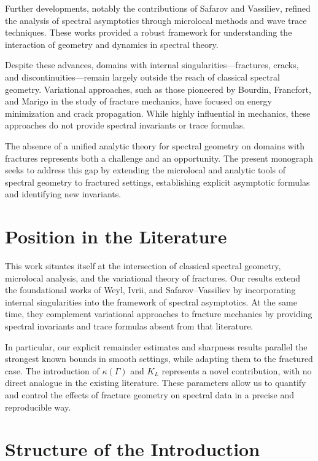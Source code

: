 Further developments, notably the contributions of Safarov and Vassiliev,
refined the analysis of spectral asymptotics through microlocal methods
and wave trace techniques. These works provided a robust framework for
understanding the interaction of geometry and dynamics in spectral
theory.

Despite these advances, domains with internal singularities—fractures,
cracks, and discontinuities—remain largely outside the reach of classical
spectral geometry. Variational approaches, such as those pioneered by
Bourdin, Francfort, and Marigo in the study of fracture mechanics, have
focused on energy minimization and crack propagation. While highly
influential in mechanics, these approaches do not provide spectral
invariants or trace formulas.

The absence of a unified analytic theory for spectral geometry on domains
with fractures represents both a challenge and an opportunity. The present
monograph seeks to address this gap by extending the microlocal and
analytic tools of spectral geometry to fractured settings, establishing
explicit asymptotic formulas and identifying new invariants.

\section{Position in the Literature}

This work situates itself at the intersection of classical spectral
geometry, microlocal analysis, and the variational theory of fractures.
Our results extend the foundational works of Weyl, Ivrii, and
Safarov–Vassiliev by incorporating internal singularities into the
framework of spectral asymptotics. At the same time, they complement
variational approaches to fracture mechanics by providing spectral
invariants and trace formulas absent from that literature.

In particular, our explicit remainder estimates and sharpness results
parallel the strongest known bounds in smooth settings, while adapting
them to the fractured case. The introduction of $\kappa(\Gamma)$ and $K_L$
represents a novel contribution, with no direct analogue in the existing
literature. These parameters allow us to quantify and control the effects
of fracture geometry on spectral data in a precise and reproducible way.

\section{Structure of the Introduction}

